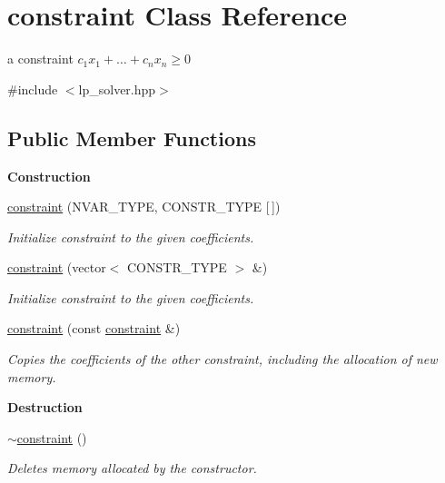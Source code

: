 \hypertarget{classconstraint}{}\section{constraint Class Reference}
\label{classconstraint}


a constraint $ c_1 x_1 + \ldots + c_n x_n \geq 0 $  




{\ttfamily \#include $<$lp\+\_\+solver.\+hpp$>$}

\subsection*{Public Member Functions}
\begin{Indent}\textbf{ Construction}\par
\begin{DoxyCompactItemize}
\item 
\hyperlink{classconstraint_aac499533508fc7e6fcdfad614dbecc48}{constraint} (N\+V\+A\+R\+\_\+\+T\+Y\+PE, C\+O\+N\+S\+T\+R\+\_\+\+T\+Y\+PE \mbox{[}$\,$\mbox{]})
\begin{DoxyCompactList}\small\item\em Initialize constraint to the given coefficients. \end{DoxyCompactList}\item 
\hyperlink{classconstraint_abcf2ec568e0dcfd37c2dc150b738ad2d}{constraint} (vector$<$ C\+O\+N\+S\+T\+R\+\_\+\+T\+Y\+PE $>$ \&)
\begin{DoxyCompactList}\small\item\em Initialize constraint to the given coefficients. \end{DoxyCompactList}\item 
\mbox{\label{classconstraint_a796ee0ed5407fb1e4a4774156f0faac9}} 
\hyperlink{classconstraint_a796ee0ed5407fb1e4a4774156f0faac9}{constraint} (const \hyperlink{classconstraint}{constraint} \&)
\begin{DoxyCompactList}\small\item\em Copies the coefficients of the other constraint, including the allocation of new memory. \end{DoxyCompactList}\end{DoxyCompactItemize}
\end{Indent}
\begin{Indent}\textbf{ Destruction}\par
\begin{DoxyCompactItemize}
\item 
\hyperlink{classconstraint_a02e58b1ce0b271e3daac2da841152582}{$\sim$constraint} ()
\begin{DoxyCompactList}\small\item\em Deletes memory allocated by the constructor. \end{DoxyCompactList}\end{DoxyCompactItemize}
\end{Indent}

